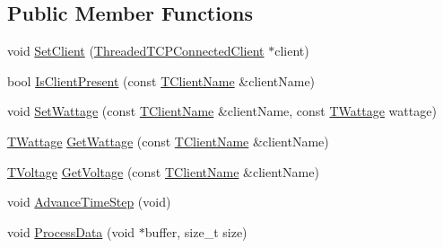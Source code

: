 \subsection*{Public Member Functions}
\begin{DoxyCompactItemize}
\item 
void \hyperlink{class_matlab_manager_ad5ff9f0aacdecada53a107e83b9e3712}{Set\-Client} (\hyperlink{class_threaded_t_c_p_connected_client}{Threaded\-T\-C\-P\-Connected\-Client} $\ast$client)
\item 
bool \hyperlink{class_matlab_manager_a1c967acc77ef8db3113e83a5325b5729}{Is\-Client\-Present} (const \hyperlink{class_matlab_manager_a62cb494115d46fdf4ecc6bd369fe0320}{T\-Client\-Name} \&client\-Name)
\item 
void \hyperlink{class_matlab_manager_a2967a226a9c6a9ed22998cad67afed3c}{Set\-Wattage} (const \hyperlink{class_matlab_manager_a62cb494115d46fdf4ecc6bd369fe0320}{T\-Client\-Name} \&client\-Name, const \hyperlink{class_matlab_manager_a410b78f356aeacba5c43efee93d8c27d}{T\-Wattage} wattage)
\item 
\hyperlink{class_matlab_manager_a410b78f356aeacba5c43efee93d8c27d}{T\-Wattage} \hyperlink{class_matlab_manager_afc7fd3eb3469eb7be2af5b857e6f45e1}{Get\-Wattage} (const \hyperlink{class_matlab_manager_a62cb494115d46fdf4ecc6bd369fe0320}{T\-Client\-Name} \&client\-Name)
\item 
\hyperlink{class_matlab_manager_a00f47f07c7dfd449fc39db6c09f6304a}{T\-Voltage} \hyperlink{class_matlab_manager_ab741bd4f6545e11dd7dd28548c5229dd}{Get\-Voltage} (const \hyperlink{class_matlab_manager_a62cb494115d46fdf4ecc6bd369fe0320}{T\-Client\-Name} \&client\-Name)
\item 
void \hyperlink{class_matlab_manager_a55151e4e7f68cad7a8b18c93e9f0e0b1}{Advance\-Time\-Step} (void)
\item 
void \hyperlink{class_matlab_manager_a7219113b7bc0744fe8faa94d599fe826}{Process\-Data} (void $\ast$buffer, size\-\_\-t size)
\end{DoxyCompactItemize}
